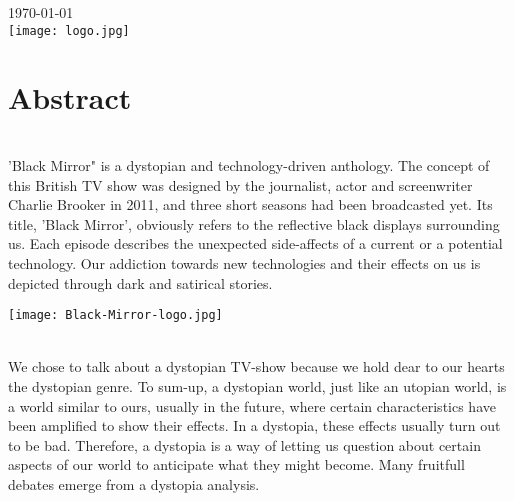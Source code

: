 \documentclass{article}
\begin{document}
\begin{titlepage}

{\large \today}\\[2cm] %


\texttt{[image: logo.jpg]}\\[1cm] %
 

\vfill %

\end{titlepage}

\section*{Abstract}\\
'Black Mirror" is a dystopian and technology-driven anthology. The concept of this British TV show was designed by the  journalist, actor and screenwriter Charlie Brooker in 2011, and three short seasons had been broadcasted yet. Its title, 'Black Mirror', obviously refers to the reflective black displays surrounding us. Each episode describes the unexpected side-affects of a current or a potential technology. Our addiction towards new technologies and their effects on us is depicted through dark and satirical stories.
\begin{center}
\texttt{[image: Black-Mirror-logo.jpg]}
\end{center}\\
We chose to talk about a dystopian TV-show because we hold dear to our hearts the dystopian genre. To sum-up, a dystopian world, just like an utopian world, is a world similar to ours, usually in the future, where certain characteristics have been amplified to show their effects. In a dystopia, these effects usually turn out to be bad.
Therefore, a dystopia is a way of letting us question about certain aspects of our world to anticipate what they might become. Many fruitfull debates emerge from a dystopia analysis.
\end{document}
